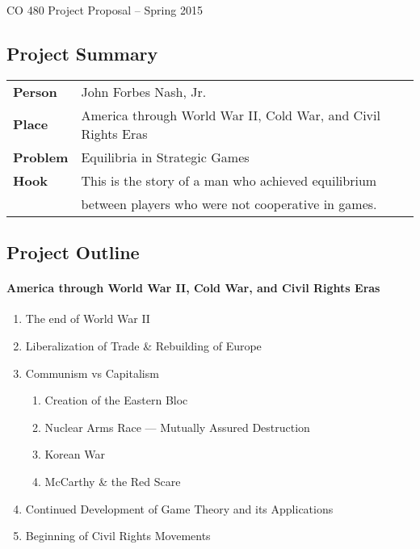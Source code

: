 \documentclass[11pt]{article}
\begin{document}
\begin{center}
{\Large CO 480 Project Proposal -- Spring 2015} 
\end{center}

\subsection*{Project Summary}
\begin{tabular}{ll}
{\bf Person}  & John Forbes Nash, Jr. \\
{\bf Place}   & America through World War II, Cold War, and Civil Rights Eras\\
{\bf Problem} & Equilibria in Strategic Games \\
{\bf Hook }   & This is the story of a man who achieved equilibrium\\  & between players who were not cooperative in games.
\end{tabular}	

\subsection*{Project Outline}

\paragraph{America through World War II, Cold War, and Civil Rights Eras}
\begin{enumerate}
	\item The end of World War II
	\item Liberalization of Trade \& Rebuilding of Europe
	\item Communism vs Capitalism
	\begin{enumerate}
		\item Creation of the Eastern Bloc
		\item Nuclear Arms Race --- Mutually Assured Destruction
		\item Korean War
		\item McCarthy \& the Red Scare
	\end{enumerate}
	\item Continued Development of Game Theory and its Applications
	\item Beginning of Civil Rights Movements
\end{enumerate}
\end{document}
